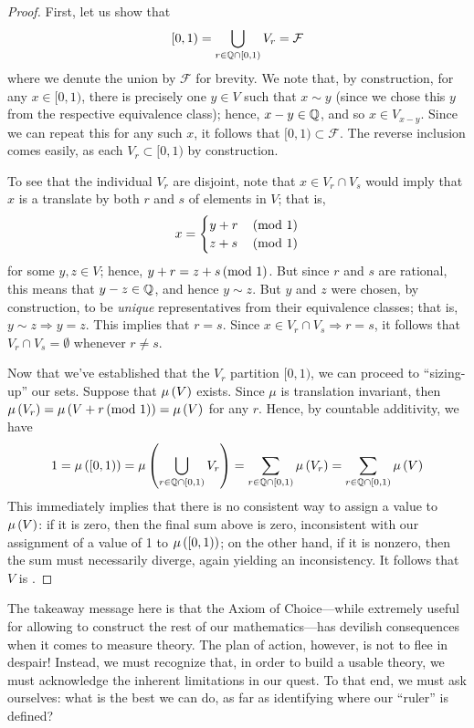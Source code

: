 \begin{proof}
First, let us show that
\[ [0,1) = \bigcup_{r \in \mathbb{Q} \cap [0,1)} V_r = \mathcal{F} \]
where we denute the union by $\mathcal{F}$ for brevity. We note that, by construction, for any $x \in [0, 1)$, there is precisely one $y \in V$ such that $x \sim y$ (since we chose this $y$ from the respective equivalence class); hence, $x - y \in \mathbb{Q}$, and so $x \in V_{x - y}$. Since we can repeat this for any such $x$, it follows that $[0,1) \subset \mathcal{F}$. The reverse inclusion comes easily, as each $V_r \subset [0,1)$ by construction.

To see that the individual $V_r$ are disjoint, note that $x \in V_r \cap V_s$ would imply that $x$ is a translate by both $r$ and $s$ of elements in $V$; that is,
\[
    x = 
\begin{cases}
    y + r      & \,(\textrm{mod } 1) \\
    z + s      & \,(\textrm{mod } 1)
\end{cases}
\]
for some $y, z \in V$; hence, $y + r = z + s \,(\textrm{mod } 1)$. But since $r$ and $s$ are rational, this means that $y - z \in \mathbb{Q}$, and hence $y \sim z$. But $y$ and $z$ were chosen, by construction, to be \emph{unique} representatives from their equivalence classes; that is, $y \sim z \Rightarrow y = z$. This implies that $r = s$. Since $x \in V_r \cap V_s \Rightarrow r = s$, it follows that $V_r \cap V_s = \emptyset$ whenever $r \neq s$.

Now that we've established that the $V_r$ partition $[0,1)$, we can proceed to ``sizing-up'' our sets. Suppose that $\mu\left( V \right)$ exists. Since $\mu$ is translation invariant, then $\mu\left( V_r \right) = \mu\left( V + r \,(\textrm{mod } 1) \right) = \mu\left( V \right)$ for any $r$. Hence, by countable additivity, we have
\[ 1 = \mu\left( [0,1) \right) = \mu\left( \bigcup_{r \in \mathbb{Q} \cap [0,1)} V_r \right) = \sum_{r \in \mathbb{Q} \cap [0,1)} \mu\left( V_r \right) = \sum_{r \in \mathbb{Q} \cap [0,1)} \mu\left( V \right) \]
This immediately implies that there is no consistent way to assign a value to $\mu\left( V \right)$: if it is zero, then the final sum above is zero, inconsistent with our assignment of a value of 1 to $\mu\left( [0,1) \right)$; on the other hand, if it is nonzero, then the sum must necessarily diverge, again yielding an inconsistency. It follows that $V$ is .
\end{proof}

The takeaway message here is that the Axiom of Choice---while extremely useful for allowing to construct the rest of our mathematics---has devilish consequences when it comes to measure theory. The plan of action, however, is not to flee in despair! Instead, we must recognize that, in order to build a usable theory, we must acknowledge the inherent limitations in our quest. To that end, we must ask ourselves: what is the best we can do, as far as identifying where our ``ruler'' is defined?

